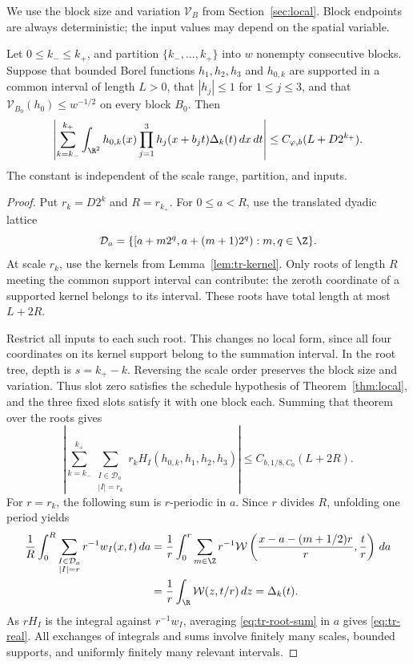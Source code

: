We use the block size and variation \(\mathcal V_B\) from
Section~\ref{sec:local}.  Block endpoints are always deterministic;
the input values may depend on the spatial variable.

\begin{lemma}
\label{lem:tr-real}
Let \(0\leq k_-\leq k_+\), and partition
\(\{k_-,\ldots,k_+\}\) into \(w\) nonempty consecutive blocks.
Suppose that bounded Borel functions \(h_1,h_2,h_3\) and
\(h_{0,k}\) are supported in a common interval of length \(L>0\),
that \(|h_j|\leq1\) for \(1\leq j\leq3\), and that
\(\mathcal V_{B_0}(h_0)\leq w^{-1/2}\) on every block \(B_0\).
Then
\begin{equation}
 \left|\sum_{k=k_-}^{k_+}\int_{\R^2}
 h_{0,k}(x)\prod_{j=1}^3h_j(x+b_jt)\Delta_k(t)\,dx\,dt\right|
 \leq C_{\varphi,b}(L+D2^{k_+}).
 \label{eq:tr-real}
\end{equation}
The constant is independent of the scale range, partition, and inputs.
\end{lemma}

\begin{proof}
Put \(r_k=D2^k\) and \(R=r_{k_+}\).  For \(0\leq a<R\), use
the translated dyadic lattice
\[
 \mathcal D_a
 =\{[a+m2^q,a+(m+1)2^q):m,q\in\Z\}.
\]
At scale \(r_k\), use the kernels from Lemma~\ref{lem:tr-kernel}.
Only roots of length \(R\) meeting the common support interval can
contribute: the zeroth coordinate of a supported kernel belongs to
its interval.  These roots have total length at most \(L+2R\).

Restrict all inputs to each such root.  This changes no local form,
since all four coordinates on its kernel support belong to the
summation interval.  In the root tree, depth is \(s=k_+-k\).
Reversing the scale order preserves the block size and variation.
Thus slot zero satisfies the schedule hypothesis of
Theorem~\ref{thm:local}, and the three fixed slots satisfy it with
one block each.  Summing that theorem over the roots gives
\begin{equation}
 \left|\sum_{k=k_-}^{k_+}
    \sum_{\substack{I\in\mathcal D_a\\|I|=r_k}}
    r_k H_I(h_{0,k},h_1,h_2,h_3)\right|
 \leq C_{b,1/8,C_0}(L+2R).
 \label{eq:tr-root-sum}
\end{equation}
For \(r=r_k\), the following sum is \(r\)-periodic in \(a\).
Since \(r\) divides \(R\), unfolding one period yields
\begin{align*}
 \frac1R\int_0^R
  \sum_{\substack{I\in\mathcal D_a\\|I|=r}}r^{-1}w_I(x,t)\,da
 &=\frac1r\int_0^r\sum_{m\in\Z}r^{-1}
   \mathcal W\left(\frac{x-a-(m+1/2)r}{r},\frac tr\right)\,da\\
 &=\frac1r\int_\R\mathcal W(z,t/r)\,dz
 =\Delta_k(t).
\end{align*}
As \(rH_I\) is the integral against \(r^{-1}w_I\), averaging
\eqref{eq:tr-root-sum} in \(a\) gives \eqref{eq:tr-real}.
All exchanges of integrals and sums involve finitely many scales,
bounded supports, and uniformly finitely many relevant intervals.
\end{proof}

